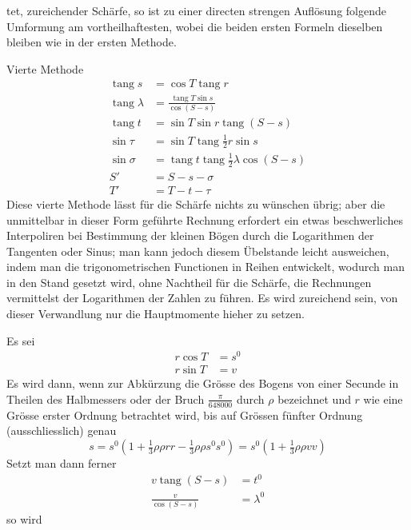 %
tet, zureichender Schärfe, so ist zu einer directen strengen Auflösung folgende Umformung am vortheilhaftesten, wobei die beiden ersten Formeln dieselben bleiben wie in der ersten Methode.

Vierte Methode
\[
\begin{aligned}
\operatorname{tang}s&=\cos T\operatorname{tang}r\\
\operatorname{tang}\lambda&=\frac{\operatorname{tang}T\sin s}{\cos(S-s)}\\
\operatorname{tang}t&=\sin T\sin r\operatorname{tang}(S-s)\\
\sin\tau&=\sin T\operatorname{tang}\tfrac{1}{2}r\sin s\\
\sin\sigma&=\operatorname{tang}t\operatorname{tang}\tfrac{1}{2}\lambda\cos(S-s)\\
S'&=S-s-\sigma\\
T'&=T-t-\tau
\end{aligned}
\]
\indent Diese vierte Methode lässt für die Schärfe nichts zu wünschen übrig; aber die unmittelbar in dieser Form geführte Rechnung erfordert ein etwas beschwerliches Interpoliren bei Bestimmung der kleinen Bögen durch die Logarithmen der Tangenten oder Sinus; man kann jedoch diesem Übelstande leicht ausweichen, indem man die trigonometrischen Functionen in Reihen entwickelt, wodurch man in den Stand gesetzt wird, ohne Nachtheil für die Schärfe, die Rechnungen vermittelst der Logarithmen der Zahlen zu führen. Es wird zureichend sein, von dieser Verwandlung nur die Hauptmomente hieher zu setzen.

Es sei
\[
\begin{aligned}
r\cos T&=s^0\\
r\sin T&=v
\end{aligned}
\]
Es wird dann, wenn zur Abkürzung die Grösse des Bogens von einer Secunde in Theilen des Halbmessers oder der Bruch \(\tfrac{\pi}{648000}\) durch \(\rho\) bezeichnet und \(r\) wie eine Grösse erster Ordnung betrachtet wird, bis auf Grössen fünfter Ordnung (ausschliesslich) genau
\[
s=s^0(1+\tfrac{1}{3}\rho\rho rr-\tfrac{1}{3}\rho\rho s^0s^0)=s^0(1+\tfrac{1}{3}\rho\rho vv)
\]
Setzt man dann ferner
\[
\begin{aligned}
v\operatorname{tang}(S-s)&=t^0\\
\frac{v}{\cos(S-s)}&=\lambda^0
\end{aligned}
\]
so wird
